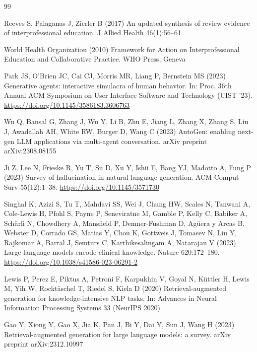 \documentclass[12pt]{article}
\begin{document}
\begin{thebibliography}{99}

Reeves S, Palaganas J, Zierler B (2017) An updated synthesis of review evidence of interprofessional education. J Allied Health 46(1):56--61

World Health Organization (2010) Framework for Action on Interprofessional Education and Collaborative Practice. WHO Press, Geneva

Park JS, O'Brien JC, Cai CJ, Morris MR, Liang P, Bernstein MS (2023) Generative agents: interactive simulacra of human behavior. In: Proc. 36th Annual ACM Symposium on User Interface Software and Technology (UIST '23). \url{https://doi.org/10.1145/3586183.3606763}

Wu Q, Bansal G, Zhang J, Wu Y, Li B, Zhu E, Jiang L, Zhang X, Zhang S, Liu J, Awadallah AH, White RW, Burger D, Wang C (2023) AutoGen: enabling next-gen LLM applications via multi-agent conversation. arXiv preprint arXiv:2308.08155

Ji Z, Lee N, Frieske R, Yu T, Su D, Xu Y, Ishii E, Bang YJ, Madotto A, Fung P (2023) Survey of hallucination in natural language generation. ACM Comput Surv 55(12):1--38. \url{https://doi.org/10.1145/3571730}

Singhal K, Azizi S, Tu T, Mahdavi SS, Wei J, Chung HW, Scales N, Tanwani A, Cole-Lewis H, Pfohl S, Payne P, Seneviratne M, Gamble P, Kelly C, Babiker A, Sch\"{a}rli N, Chowdhery A, Mansfield P, Demner-Fushman D, Ag\"{u}era y Arcas B, Webster D, Corrado GS, Matias Y, Chou K, Gottweis J, Tomasev N, Liu Y, Rajkomar A, Barral J, Semturs C, Karthikesalingam A, Natarajan V (2023) Large language models encode clinical knowledge. Nature 620:172--180. \url{https://doi.org/10.1038/s41586-023-06291-2}

Lewis P, Perez E, Piktus A, Petroni F, Karpukhin V, Goyal N, K\"{u}ttler H, Lewis M, Yih W, Rockt\"{a}schel T, Riedel S, Kiela D (2020) Retrieval-augmented generation for knowledge-intensive NLP tasks. In: Advances in Neural Information Processing Systems 33 (NeurIPS 2020)

Gao Y, Xiong Y, Gao X, Jia K, Pan J, Bi Y, Dai Y, Sun J, Wang H (2023) Retrieval-augmented generation for large language models: a survey. arXiv preprint arXiv:2312.10997


\end{thebibliography}
\end{document}
